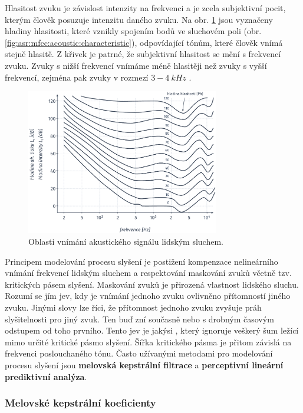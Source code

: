 Hlasitost zvuku je závislost intenzity na frekvenci a je zcela subjektivní pocit, kterým člověk posuzuje intenzitu daného zvuku. Na obr. \ref{fig:asr:mfcc:acoustic:levels} jsou vyznačeny hladiny hlasitosti, které vznikly spojením bodů ve sluchovém poli (obr. \ref{fig:asr:mfcc:acoustic:characteristic}), odpovídající tónům, které člověk vnímá stejně hlasitě. Z křivek je patrné, že subjektivní hlasitost se mění s frekvencí zvuku. Zvuky s nižší frekvencí vnímáme méně hlasitěji než zvuky s vyšší frekvencí, zejména pak zvuky v rozmezí $3 - 4\ kHz$ \cite{Psutka2006}.

\begin{figure}[hbpt]
  \centering
  \includegraphics[width=0.75\textwidth]{./ch4-asr/img/listening_levels.pdf}
  \caption{Oblasti vnímání akustického signálu lidským sluchem.}
  \label{fig:asr:mfcc:acoustic:levels}
\end{figure}

Principem modelování procesu slyšení je postižení kompenzace nelineárního vnímání frekvencí lidským sluchem a respektování maskování zvuků včetně tzv. kritických pásem slyšení. Maskování zvuků je přirozená vlastnost lidského sluchu. Rozumí se jím jev, kdy je vnímání jednoho zvuku ovlivněno přítomností jiného zvuku. Jinými slovy lze říci, že přítomnost jednoho zvuku zvyšuje práh slyšitelnosti pro jiný zvuk. Ten buď zní současně nebo s drobným časovým odstupem od toho prvního. Tento jev je jakýsi , který ignoruje veškerý šum ležící mimo určité kritické pásmo slyšení. Šířka kritického pásma je přitom závislá na frekvenci poslouchaného tónu. Často užívanými metodami pro modelování procesu slyšení jsou \textbf{melovská kepstrální filtrace} a \textbf{perceptivní lineární prediktivní analýza}.

\subsubsection{Melovské kepstrální koeficienty}

